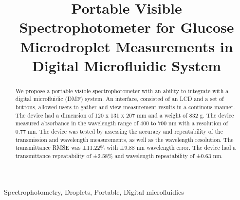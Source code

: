 \documentclass[conference]{IEEEtran}
\begin{document}
\makeatletter
\newcommand{\newlineauthors}{%
  \end{@IEEEauthorhalign}\hfill\mbox{}\par
  \mbox{}\hfill\begin{@IEEEauthorhalign}
}
\makeatother

\title{Portable Visible Spectrophotometer for Glucose Microdroplet Measurements in Digital Microfluidic System}

\author{
}

\maketitle

\begin{abstract}
We propose a portable visible spectrophotometer with an ability to integrate with a digital microfluidic (DMF) system.
An interface, consisted of an LCD and a set of buttons, allowed users to gather and view measurement results in a continous manner.
The device had a dimension of 120 x 131 x 207 mm and a weight of 832 g.
The device measured absorbance in the wavelength range of 400 to 700 nm with a resolution of 0.77 nm.
The device was tested by assessing the accuracy and repeatability of the transmission and wavelength measurements, as well as the wavelength resolution.
The transmittance RMSE was ±11.22\% with ±9.88 nm wavelength error.
The device had a transmittance repeatability of ±2.58\% and wavelength repeatability of ±0.63 nm.
\end{abstract}

\begin{IEEEkeywords}
    Spectrophotometry, Droplets, Portable, Digital microfluidics
\end{IEEEkeywords}
\end{document}
